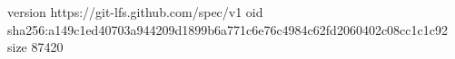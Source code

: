 version https://git-lfs.github.com/spec/v1
oid sha256:a149c1ed40703a944209d1899b6a771c6e76c4984c62fd2060402c08cc1c1c92
size 87420
